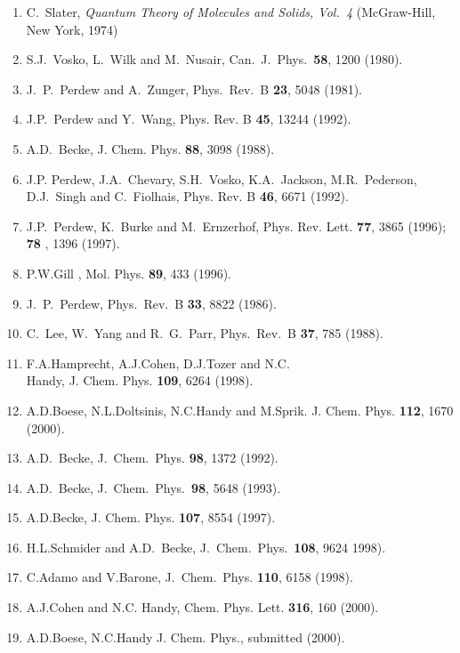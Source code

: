 {\footnotesize
\vspace{8.5cm}
\begin{enumerate}\setlength{\itemsep}{-1\baselineskip}
\setlength{\parsep}{-1\baselineskip}
\item C.~Slater, {\sl Quantum Theory of Molecules and Solids, 
Vol.~4} (McGraw-Hill, New York, 1974) \\
\item  S.J.~Vosko, L.~Wilk and M.~Nusair,
Can.~J.~Phys.~{\bf 58}, 1200 (1980). \\
\item  J.~P.~Perdew and A.~Zunger,  Phys.~Rev.~B {\bf23}, 5048
(1981). \\
\item  J.P.~Perdew and Y.~Wang, Phys. Rev. B {\bf 45},
13244 (1992). \\
\item   A.D.~Becke,  J. Chem. Phys. {\bf 88}, 3098 (1988). \\ 
\item  J.P. Perdew,  J.A.~Chevary, S.H.~Vosko, K.A.~Jackson, 
M.R.~Pederson, D.J.~Singh and C.~Fiolhais, Phys. Rev. B {\bf 46}, 6671
(1992). \\
\item  J.P.~Perdew, K.~Burke and M.~Ernzerhof, 
Phys. Rev. Lett. {\bf 77}, 3865 (1996); {\bf 78 }, 1396 (1997).\\
\item  P.W.Gill , Mol. Phys. {\bf 89}, 433 (1996). \\
\item  J.~P.~Perdew, Phys.~Rev.~B   {\bf33}, 8822 (1986). \\
\item C.~Lee, W.~Yang and R.~G.~Parr, Phys.~Rev.~B {\bf 37}, 785
(1988). \\
\item  F.A.Hamprecht, A.J.Cohen, D.J.Tozer and N.C.\\ Handy, 
    J. Chem. Phys. {\bf 109}, 6264 (1998). \\
\item   A.D.Boese, N.L.Doltsinis, N.C.Handy and
M.Sprik. J. Chem. Phys. {\bf 112}, 1670 (2000). \\
\item  A.D.~Becke, J.~Chem.~Phys. {\bf 98}, 1372 (1992). \\
\item  A.D.~Becke, J.~Chem.~Phys.~{\bf 98}, 5648 (1993). \\
\item A.D.Becke, J. Chem. Phys. {\bf 107}, 8554 (1997). \\
\item  H.L.Schmider and A.D.~Becke, J.~Chem.~Phys.~{\bf 108},
9624 1998). \\
\item C.Adamo and V.Barone, J.~Chem.~Phys. {\bf 110}, 6158 (1998).\\
\item  A.J.Cohen and N.C. Handy, Chem. Phys. Lett. {\bf 316}, 160 (2000).\\
\item   A.D.Boese,  N.C.Handy  J. Chem. Phys., submitted (2000). \\
\end{enumerate}
}
